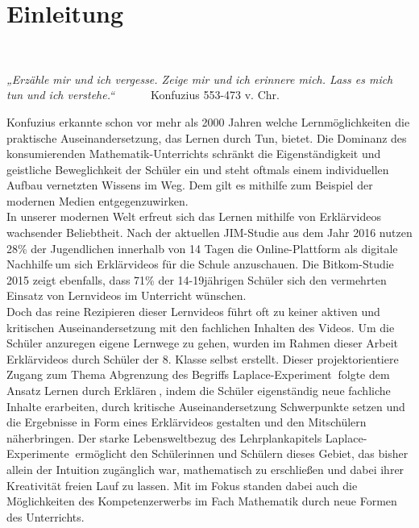 \documentclass[a4paper,12pt,twoside=false]{scrartcl}
\begin{document}
\renewcommand{\labelenumi}{(\alph{enumi})}

\onehalfspacing
\newpage
%
\tableofcontents 
\newpage


\section{Einleitung}
\begin{minipage}{0.5\textwidth}
	$~$
\end{minipage}
\begin{minipage}{0.5\textwidth}
\textit{„Erzähle mir und ich vergesse. Zeige mir und ich erinnere mich. Lass es mich tun und ich verstehe.“} $~~~~~~~~~~~~~$\small{Konfuzius 553-473 v. Chr.}
\vspace{1cm} 
\end{minipage}
 Konfuzius erkannte schon vor mehr als 2000 Jahren welche Lernmöglichkeiten die praktische Auseinandersetzung, das Lernen durch Tun, bietet. Die Dominanz des konsumierenden Mathematik-Unterrichts schränkt die Eigenständigkeit und geistliche Beweglichkeit der Schüler ein und steht oftmals einem individuellen Aufbau vernetzten Wissens im Weg. \cite{klett14} Dem gilt es mithilfe zum Beispiel der modernen Medien entgegenzuwirken. \\In unserer modernen Welt erfreut sich das Lernen mithilfe von Erklärvideos wachsender Beliebtheit. 
Nach der aktuellen JIM-Studie aus dem Jahr 2016 nutzen 28\% der Jugendlichen innerhalb von 14 Tagen die Online-Plattform als \glqq digitale Nachhilfe\grqq $~$um sich Erklärvideos für die Schule anzuschauen. Die Bitkom-Studie 2015 zeigt ebenfalls, dass 71\% der 14-19jährigen Schüler sich den vermehrten Einsatz von Lernvideos im Unterricht wünschen. \\
Doch das reine Rezipieren dieser Lernvideos führt oft zu keiner aktiven und kritischen Auseinandersetzung mit den fachlichen Inhalten des Videos. Um die Schüler anzuregen eigene Lernwege zu gehen, wurden im Rahmen dieser Arbeit Erklärvideos durch Schüler der 8. Klasse selbst erstellt. Dieser projektorientiere Zugang zum Thema \glqq Abgrenzung des Begriffs \glqq Laplace-Experiment\grqq$~$ folgte dem Ansatz \glqq Lernen durch Erklären\grqq$~$, indem die Schüler eigenständig neue fachliche Inhalte erarbeiten, durch kritische Auseinandersetzung Schwerpunkte setzen und die Ergebnisse in Form eines Erklärvideos gestalten und den Mitschülern näherbringen. Der starke Lebensweltbezug des Lehrplankapitels \glqq Laplace-Experimente\grqq $~$ ermöglicht den Schülerinnen und Schülern dieses Gebiet, das bisher allein der Intuition zugänglich war, mathematisch zu erschließen und dabei ihrer Kreativität freien Lauf zu lassen. \cite{lp16} Mit im Fokus standen dabei auch die Möglichkeiten des Kompetenzerwerbs im Fach Mathematik durch neue Formen des Unterrichts. 
\end{document}
